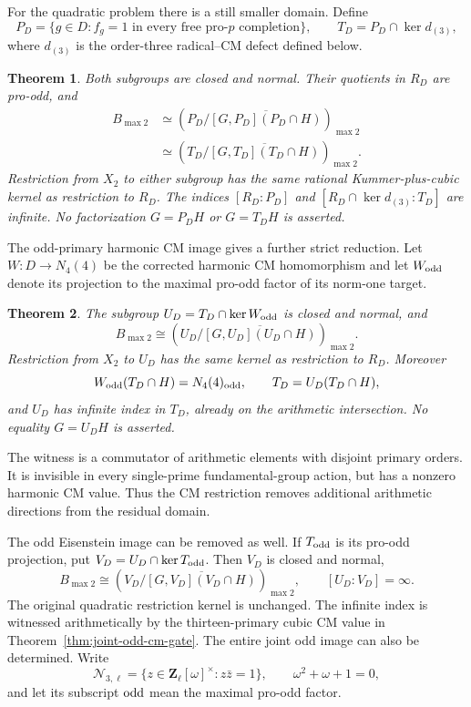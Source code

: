\documentclass[11pt,a4paper]{article}
\newtheorem{theorem}{Theorem}[section]
\theoremstyle{definition}
\theoremstyle{remark}
\begin{document}
For the quadratic problem there is a still smaller domain. Define
\[
 P_D=\{g\in D:f_g=1\text{ in every free pro-$p$ completion}\},
 \qquad T_D=P_D\cap\ker d_{(3)},
\]
where $d_{(3)}$ is the order-three radical--CM defect defined below.

\begin{theorem}\label{thm:main-all-prime-quadratic-domain}
Both subgroups are closed and normal. Their quotients in $R_D$
are pro-odd, and
\[
 \begin{aligned}
 B_{\max2}&\simeq
 \left(P_D/\overline{[G,P_D](P_D\cap H)}\right)_{\max2}\\
 &\simeq
 \left(T_D/\overline{[G,T_D](T_D\cap H)}\right)_{\max2}.
 \end{aligned}
\]
Restriction from $X_2$ to either subgroup has the same rational
Kummer-plus-cubic kernel as restriction to $R_D$.
The indices $[R_D:P_D]$ and
$[R_D\cap\ker d_{(3)}:T_D]$ are infinite.
No factorization $G=P_DH$ or $G=T_DH$ is asserted.
\end{theorem}

The odd-primary harmonic CM image gives a further strict reduction.
Let \(W:D\to N_4(4)\) be the corrected harmonic CM homomorphism
and let \(W_{\rm odd}\) denote its projection to the maximal pro-odd
factor of its norm-one target.

\begin{theorem}\label{thm:main-odd-cm-domain}
The subgroup \(U_D=T_D\cap\ker W_{\rm odd}\) is closed and normal,
and
\[
 B_{\max2}\cong
 \left(U_D/\overline{[G,U_D](U_D\cap H)}\right)_{\max2}.
\]
Restriction from \(X_2\) to \(U_D\) has the same kernel as restriction
to \(R_D\). Moreover
\[
 W_{\rm odd}(T_D\cap H)=N_4(4)_{\rm odd},\qquad
 T_D=U_D(T_D\cap H),
\]
and \(U_D\) has infinite index in \(T_D\), already on the arithmetic
intersection. No equality \(G=U_DH\) is asserted.
\end{theorem}

The witness is a commutator of arithmetic elements with disjoint
primary orders. It is invisible in every single-prime fundamental-group
action, but has a nonzero harmonic CM value. Thus the CM restriction
removes additional arithmetic directions from the residual domain.

The odd Eisenstein image can be removed as well. If \(T_{\rm odd}\)
is its pro-odd projection, put \(V_D=U_D\cap\ker T_{\rm odd}\).
Then \(V_D\) is closed and normal,
\[
 B_{\max2}\cong
 \left(V_D/\overline{[G,V_D](V_D\cap H)}\right)_{\max2},
 \qquad [U_D:V_D]=\infty.
\]
The original quadratic restriction kernel is unchanged. The infinite
index is witnessed arithmetically by the thirteen-primary cubic CM
value in Theorem~\ref{thm:joint-odd-cm-gate}. The entire joint odd
image can also be determined. Write
\[
 \mathcal N_{3,\ell}=
 \{z\in\mathbf Z_\ell[\omega]^\times:z\bar z=1\},
 \qquad \omega^2+\omega+1=0,
\]
and let its subscript \({\rm odd}\) mean the maximal pro-odd factor.
\end{document}
